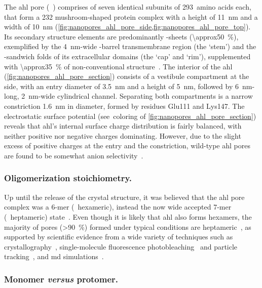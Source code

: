 The \gls{ahl} pore (~\cite{Song-1996}) comprises of seven identical subunits of 293~amino acids
each, that form a \SI{232}{\kDa} mushroom-shaped protein complex with a height of \SI{11}{\nm} and a width of
\SI{10}{\nm} (\cref{fig:nanopores_ahl_pore_side,fig:nanopores_ahl_pore_top}). Its secondary structure elements
are predominantly \tb-sheets (\SI{\approx50}{\percent}), exemplified by the \SI{4}{\nm}-wide \tb-barrel
transmembrane region (the `stem') and the \tb-sandwich folds of its extracellular domains (the `cap' and
`rim'), supplemented with \SI{\approx35}{\percent} of non-conventional structure~\cite{Song-1996}. The
interior of the \gls{ahl} (\cref{fig:nanopores_ahl_pore_section}) consists of a vestibule compartment at the
\cisi{} side, with an entry diameter of \SI{3.5}{\nm} and a height of \SI{5}{\nm}, followed by
\SI{6}{\nm}-long, \SI{2}{\nm}-wide cylindrical channel. Separating both compartments is a narrow constriction
\SI{1.6}{\nm} in diameter, formed by residues Glu111 and Lys147. The electrostatic surface potential
(see~coloring of \cref{fig:nanopores_ahl_pore_section}) reveals that \gls{ahl}'s internal surface charge
distribution is fairly balanced, with neither positive nor negative charges dominating. However, due to the
slight excess of positive charges at the \cisi{} entry and the constriction, wild-type \gls{ahl} pores are
found to be somewhat anion selectivity~\cite{Menestrina-1986}.


\subsubsection{Oligomerization stoichiometry.}
%

Up until the release of the crystal structure, it was believed that the \gls{ahl} pore complex was a 6-mer
(\ie~hexameric), instead the now wide accepted 7-mer (\ie~heptameric) state~\cite{Song-1996}. Even though it
is likely that \gls{ahl} also forms hexamers, the majority of pores (\SI{>90}{\percent}) formed under typical
conditions are heptameric~\cite{Menestrina-1986}, as supported by scientific evidence from a wide variety of
techniques such as crystallography~\cite{Song-1996,Galdiero-2004}, single-molecule fluorescence
photobleaching~\cite{Das-2007} and particle tracking~\cite{Thompson-2011}, and \gls{md}
simulations~\cite{Aksimentiev-2005,Bhattacharya-2011,Basdevant-2019}. 


\subsubsection{Monomer \textit{versus} protomer.}
%

